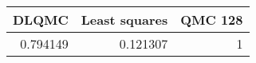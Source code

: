 \begin{tabular}{rrr}
\toprule
    DLQMC &   Least squares &   QMC 128 \\
\midrule
 0.794149 &        0.121307 &         1 \\
\bottomrule
\end{tabular}
